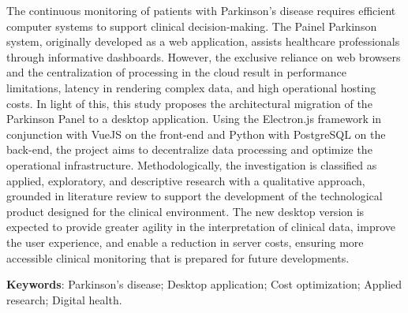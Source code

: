 
\begin{resumo}[ABSTRACT]

    \begin{SingleSpacing}
    
    The continuous monitoring of patients with Parkinson’s disease requires
efficient computer systems to support clinical decision-making. The Painel Parkinson system,
originally developed as a web application, assists healthcare professionals
through informative dashboards. However, the exclusive reliance on web browsers
and the centralization of processing in the cloud result in performance limitations, latency
in rendering complex data, and high operational hosting costs. In light
of this, this study proposes the architectural migration of the Parkinson Panel to a
desktop application. Using the Electron.js framework in conjunction with VueJS on the front-end and Python
with PostgreSQL on the back-end, the project aims to decentralize data processing and
optimize the operational infrastructure. Methodologically, the investigation is classified as
applied, exploratory, and descriptive research with a qualitative approach, grounded
in literature review to support the development of the technological product
designed for the clinical environment. The new desktop version is expected to provide greater agility
in the interpretation of clinical data, improve the user experience, and enable a reduction in
server costs, ensuring more accessible clinical monitoring that is prepared
for future developments. 

        
        \textbf{Keywords}: Parkinson’s disease; Desktop application; Cost optimization; Applied research; Digital health.
    \end{SingleSpacing}
    
\end{resumo}
